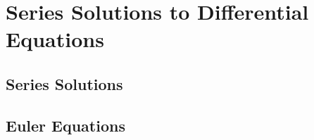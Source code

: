 \documentclass[../satmath.tex]{subfiles}
\begin{document}
\chapter{Series Solutions to Differential Equations}
\section{Series Solutions}
\section{Euler Equations}
\end{document}
